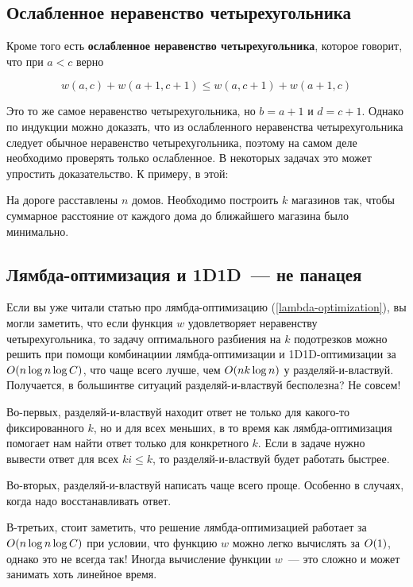 \subsection{Ослабленное неравенство четырехугольника}

Кроме того есть \textbf{ослабленное неравенство четырехугольника}, которое говорит, что при $a < c$ верно

$$w(a, c) + w(a + 1, c + 1) \le w(a, c + 1) + w(a + 1, c)$$

Это то же самое неравенство четырехугольника, но $b = a + 1$ и $d = c + 1$. Однако по индукции можно доказать, что из ослабленного неравенства четырехугольника следует обычное неравенство четырехугольника, поэтому на самом деле необходимо проверять только ослабленное. В некоторых задачах это может упростить доказательство. К примеру, в этой:

\begin{problem}
    На дороге расставлены $n$ домов. Необходимо построить $k$ магазинов так, чтобы суммарное расстояние от каждого дома до ближайшего магазина было минимально.
\end{problem}

\subsection{Лямбда-оптимизация и 1D1D~--- не панацея}

Если вы уже читали статью про лямбда-оптимизацию (\ref{lambda-optimization}), вы могли заметить, что если функция $w$ удовлетворяет неравенству четырехугольника, то задачу оптимального разбиения на $k$ подотрезков можно решить при помощи комбинациии лямбда-оптимизации и 1D1D-оптимизации за $O(n \log n \log C)$, что чаще всего лучше, чем $O(n k \log n)$ у разделяй-и-властвуй. Получается, в большинтве ситуаций разделяй-и-властвуй бесполезна? Не совсем!

Во-первых, разделяй-и-властвуй находит ответ не только для какого-то фиксированного $k$, но и для всех меньших, в то время как лямбда-оптимизация помогает нам найти ответ только для конкретного $k$. Если в задаче нужно вывести ответ для всех $ki \le k$, то разделяй-и-властвуй будет работать быстрее.

Во-вторых, разделяй-и-властвуй написать чаще всего проще. Особенно в случаях, когда надо восстанавливать ответ.

В-третьих, стоит заметить, что решение лямбда-оптимизацией работает за $O(n \log n \log C)$ при условии, что функцию $w$ можно легко вычислять за $O(1)$, однако это не всегда так! Иногда вычисление функции $w$~--- это сложно и может занимать хоть линейное время.

